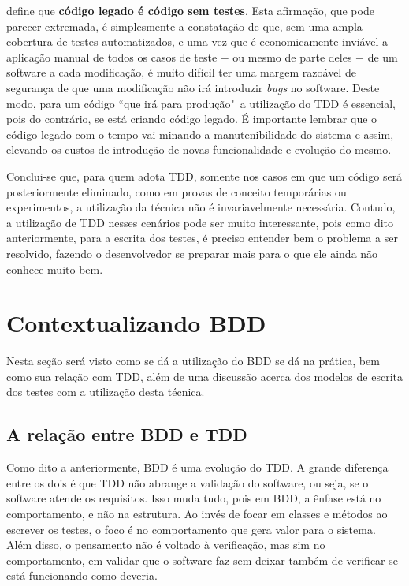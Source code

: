  define que \textbf{código legado é código sem testes}. Esta afirmação, que pode parecer extremada, é simplesmente a constatação de que, sem uma ampla cobertura de testes automatizados, e uma vez que é economicamente inviável a aplicação manual de todos os casos de teste $-$ ou mesmo de parte deles $-$ de um software a cada modificação, é muito difícil ter uma margem razoável de segurança de que uma modificação não irá introduzir \textit{bugs} no software. Deste modo, para um código ``que irá para produção"\ a utilização do TDD é essencial, pois do contrário, se está criando código legado. É importante lembrar que o código legado com o tempo vai minando a manutenibilidade do sistema e assim, elevando os custos de introdução de novas funcionalidade e evolução do mesmo.

Conclui-se que, para quem adota TDD, somente nos casos em que um código será posteriormente eliminado, como em provas de conceito temporárias ou experimentos, a utilização da técnica não é invariavelmente necessária. Contudo, a utilização de TDD nesses cenários pode ser muito interessante, pois como dito anteriormente, para a escrita dos testes, é preciso entender bem o problema a ser resolvido, fazendo o desenvolvedor se preparar mais para o que ele ainda não conhece muito bem.


\section{Contextualizando BDD}

Nesta seção será visto como se dá a utilização do BDD se dá na prática, bem como sua relação com TDD, além de uma discussão acerca dos modelos de escrita dos testes com a utilização desta técnica.

\subsection{A relação entre BDD e TDD}
\label{sub:a_relacao_entre_bdd_e_tdd}

Como dito a anteriormente, BDD é uma evolução do TDD. A grande diferença entre os dois é que TDD não abrange a validação do software, ou seja, se o software atende os requisitos. Isso muda tudo, pois em BDD, a ênfase está no comportamento, e não na estrutura. Ao invés de focar em classes e métodos ao escrever os testes, o foco é no comportamento que gera valor para o sistema. Além disso, o pensamento não é voltado à verificação, mas sim no comportamento, em validar que o software faz sem deixar também de verificar se está funcionando como deveria.

